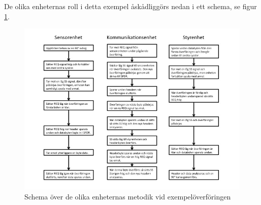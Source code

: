 De olika enheternas roll i detta exempel åskådliggörs nedan i ett schema, se 
figur \ref{fig:schema}.


\begin{figure}[H]
 \centering
\includegraphics[angle=0,scale=0.7]{bilder/schema_exempel.jpg}
  \caption{Schema över de olika enheternas metodik vid exempelöverföringen}
  \label{fig:schema}
\end{figure}



